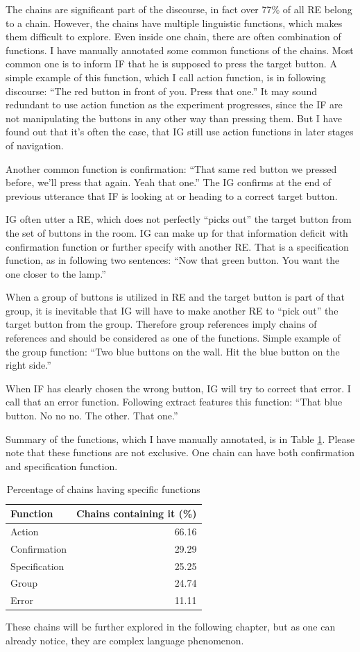 The chains are significant part of the discourse, in fact over 77\% of all RE belong to a chain. However, the chains have multiple linguistic functions, which makes them difficult to explore. Even inside one chain, there are often combination of functions. I have manually annotated some common functions of the chains. Most common one is to inform IF that he is supposed to press the target button. A simple example of this function, which I call action function, is in following discourse: ``The red button in front of you. Press that one.'' It may sound redundant to use action function as the experiment progresses, since the IF are not manipulating the buttons in any other way than pressing them. But I have found out that it's often the case, that IG still use action functions in later stages of navigation.

Another common function is confirmation: ``That same red button we pressed before, we'll press that again. Yeah that one.'' The IG confirms at the end of previous utterance that IF is looking at or heading to a correct target button.

IG often utter a RE, which does not perfectly ``picks out'' the target button from the set of buttons in the room. IG can make up for that information deficit with confirmation function or further specify with another RE. That is a specification function, as in following two sentences: ``Now that green button. You want the one closer to the lamp.''

When a group of buttons is utilized in RE and the target button is part of that group, it is inevitable that IG will have to make another RE to ``pick out'' the target button from the group. Therefore group references imply chains of references and should be considered as one of the functions. Simple example of the group function: ``Two blue buttons on the wall. Hit the blue button on the right side.''

When IF has clearly chosen the wrong button, IG will try to correct that error. I call that an error function. Following extract features this function: ``That blue button. No no no. The other. That one.''

Summary of the functions, which I have manually annotated, is in Table \ref{tab:chains-functions}. Please note that these functions are not exclusive. One chain can have both confirmation and specification function.

\begin{table}[!htbp]
 \centering
\begin{tabular}{lr}
\toprule
Function   & Chains containing it (\%)  \\
\midrule
Action    		& 66.16\\
Confirmation	 	& 29.29\\
Specification 	& 25.25\\
Group 	  		& 24.74\\
Error 			& 11.11\\
\bottomrule
\end{tabular}
\caption{Percentage of chains having specific functions}
\label{tab:chains-functions}
\end{table}

These chains will be further explored in the following chapter, but as one can already notice, they are complex language phenomenon.



